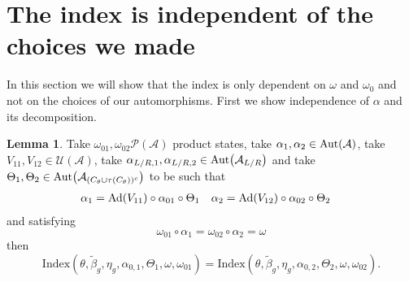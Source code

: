 \documentclass[12pt,a4paper,twoside]{article}
\let\originalleft\left
\let\originalright\right
\renewcommand{\left}{\mathopen{}\mathclose\bgroup\originalleft}
\renewcommand{\right}{\aftergroup\egroup\originalright}
\newcommand{\UU}{\mathcal U}
\newcommand{\PP}{\mathcal P}
\renewcommand{\AA}{\mathcal A}
\newcommand{\Ad}[1]{\textrm{Ad}\left(#1\right)}
\newcommand{\Aut}[1]{\textrm{Aut}\left(#1\right)}
\theoremstyle{definition}
\newtheorem{lemma}[theorem]{Lemma}
\numberwithin{equation}{section}
\begin{document}
\section{The index is independent of the choices we made}
In this section we will show that the index is only dependent on $\omega$ and $\omega_0$ and not on the choices of our automorphisms. First we show independence of $\alpha$ and its decomposition.
\begin{lemma}
	Take $\omega_{01},\omega_{02}\PP(\AA)$ product states, take $\alpha_1,\alpha_2\in\Aut{\AA}$, take $V_{11},V_{12}\in\UU(\AA)$, take $\alpha_{L/R,1},\alpha_{L/R,2}\in\Aut{\AA_{L/R}}$ and take $\Theta_1,\Theta_2\in \Aut{\AA_{(C_\theta\cup \tau(C_\theta))^c}}$ to be such that
	\begin{align}
		\alpha_1&=\Ad{V_{11}}\circ\alpha_{01}\circ\Theta_1&\alpha_2&=\Ad{V_{12}}\circ\alpha_{02}\circ \Theta_2
	\end{align}
	and satisfying
	\begin{equation}
		\omega_{01}\circ\alpha_1=\omega_{02}\circ\alpha_2=\omega
	\end{equation}
	then
	\begin{equation}
		\textrm{Index}(\theta,\tilde{\beta}_g,\eta_g,\alpha_{0,1},\Theta_1,\omega,\omega_{01})=\textrm{Index}(\theta,\tilde{\beta}_g,\eta_g,\alpha_{0,2},\Theta_2,\omega,\omega_{02}).
	\end{equation}
\end{lemma}
\end{document}
